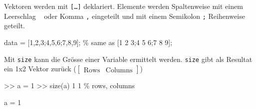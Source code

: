 \documentclass[
  10pt,
  a4paper,
  german]{article}
\newenvironment{Shaded}{}{}
\newcommand{\CommentTok}[1]{\textcolor[rgb]{0.42,0.45,0.49}{#1}}
\newcommand{\FloatTok}[1]{\textcolor[rgb]{0.00,0.36,0.77}{#1}}
\newcommand{\NormalTok}[1]{\textcolor[rgb]{0.14,0.16,0.18}{#1}}
\newcommand{\OperatorTok}[1]{\textcolor[rgb]{0.14,0.16,0.18}{#1}}
\newcommand{\VariableTok}[1]{\textcolor[rgb]{0.89,0.38,0.04}{#1}}
\numberwithin{equation}{section}
\begin{document}
\begin{multicols}{2}
Vektoren werden mit \texttt{{[}…{]}} deklariert. Elemente werden
Spaltenweise mit einem Leerschlag
\texttt{\textquotesingle{}\ \textquotesingle{}} oder Komma \texttt{,}
eingeteilt und mit einem Semikolon \texttt{;} Reihenweise geteilt.

\begin{Shaded}
\begin{Highlighting}[]
\VariableTok{data} \OperatorTok{=}\NormalTok{ [}\FloatTok{1}\OperatorTok{,}\FloatTok{2}\OperatorTok{,}\FloatTok{3}\OperatorTok{;}\FloatTok{4}\OperatorTok{,}\FloatTok{5}\OperatorTok{,}\FloatTok{6}\OperatorTok{;}\FloatTok{7}\OperatorTok{,}\FloatTok{8}\OperatorTok{,}\FloatTok{9}\NormalTok{]}\OperatorTok{;} \CommentTok{\% same as [1 2 3;4 5 6;7 8 9];}
\end{Highlighting}
\end{Shaded}

\begin{tcolorbox}[enhanced jigsaw, bottomrule=.15mm, coltitle=black, colframe=quarto-callout-note-color-frame, left=2mm, leftrule=.75mm, colback=white, titlerule=0mm, bottomtitle=1mm, breakable, toptitle=1mm, colbacktitle=quarto-callout-note-color!10!white, title=\textcolor{quarto-callout-note-color}{\faInfo}\hspace{0.5em}{Grösse \texttt{size}}, opacityback=0, rightrule=.15mm, arc=.35mm, opacitybacktitle=0.6, toprule=.15mm]

Mit \texttt{size} kann die Grösse einer Variable ermittelt werden.
\texttt{size} gibt als Resultat ein 1x2 Vektor zurück
(\(\begin{bmatrix}\text{Rows} & \text{Columns}\end{bmatrix}\))

\begin{Shaded}
\begin{Highlighting}[]
\OperatorTok{\textgreater{}\textgreater{}} \VariableTok{a} \OperatorTok{=} \FloatTok{1}
\OperatorTok{\textgreater{}\textgreater{}} \VariableTok{size}\NormalTok{(}\VariableTok{a}\NormalTok{)}
     \FloatTok{1}     \FloatTok{1}  \CommentTok{\% rows, columns}
\end{Highlighting}
\end{Shaded}

\end{tcolorbox}

\begin{Shaded}
\begin{Highlighting}[]
\VariableTok{a} \OperatorTok{=} \FloatTok{1}
\end{Highlighting}
\end{Shaded}


\end{multicols}
\end{document}
